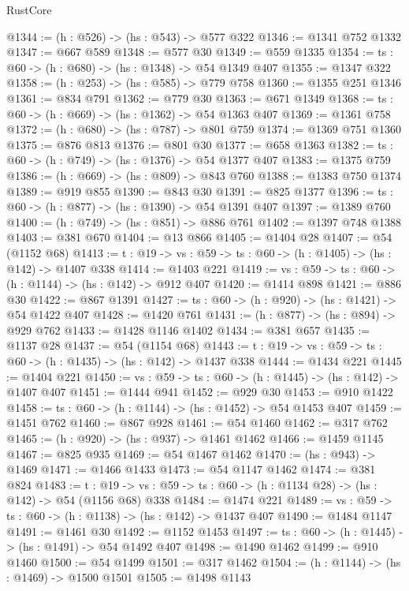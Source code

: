 \begin{lexlean}{RustCore}
\begin{coremodule}
@1344 := (h : @526) -> (hs : @543) -> @577 @322
@1346 := @1341 @752 @1332
@1347 := @667 @589
@1348 := @577 @30
@1349 := @559 @1335
@1354 := {ts : @60} -> (h : @680) -> (hs : @1348) -> @54 @1349 @407
@1355 := @1347 @322
@1358 := (h : @253) -> (hs : @585) -> @779 @758
@1360 := @1355 @251 @1346
@1361 := @834 @791
@1362 := @779 @30
@1363 := @671 @1349
@1368 := {ts : @60} -> (h : @669) -> (hs : @1362) -> @54 @1363 @407
@1369 := @1361 @758
@1372 := (h : @680) -> (hs : @787) -> @801 @759
@1374 := @1369 @751 @1360
@1375 := @876 @813
@1376 := @801 @30
@1377 := @658 @1363
@1382 := {ts : @60} -> (h : @749) -> (hs : @1376) -> @54 @1377 @407
@1383 := @1375 @759
@1386 := (h : @669) -> (hs : @809) -> @843 @760
@1388 := @1383 @750 @1374
@1389 := @919 @855
@1390 := @843 @30
@1391 := @825 @1377
@1396 := {ts : @60} -> (h : @877) -> (hs : @1390) -> @54 @1391 @407
@1397 := @1389 @760
@1400 := (h : @749) -> (hs : @851) -> @886 @761
@1402 := @1397 @748 @1388
@1403 := @381 @670
@1404 := @13 @866
@1405 := @1404 @28
@1407 := @54 (@1152 @68)
@1413 := {t : @19} -> {vs : @59} -> {ts : @60} -> (h : @1405) -> (hs : @142) -> @1407 @338
@1414 := @1403 @221
@1419 := {vs : @59} -> {ts : @60} -> (h : @1144) -> (hs : @142) -> @912 @407
@1420 := @1414 @898
@1421 := @886 @30
@1422 := @867 @1391
@1427 := {ts : @60} -> (h : @920) -> (hs : @1421) -> @54 @1422 @407
@1428 := @1420 @761
@1431 := (h : @877) -> (hs : @894) -> @929 @762
@1433 := @1428 @1146 @1402
@1434 := @381 @657
@1435 := @1137 @28
@1437 := @54 (@1154 @68)
@1443 := {t : @19} -> {vs : @59} -> {ts : @60} -> (h : @1435) -> (hs : @142) -> @1437 @338
@1444 := @1434 @221
@1445 := @1404 @221
@1450 := {vs : @59} -> {ts : @60} -> (h : @1445) -> (hs : @142) -> @1407 @407
@1451 := @1444 @941
@1452 := @929 @30
@1453 := @910 @1422
@1458 := {ts : @60} -> (h : @1144) -> (hs : @1452) -> @54 @1453 @407
@1459 := @1451 @762
@1460 := @867 @928
@1461 := @54 @1460
@1462 := @317 @762
@1465 := (h : @920) -> (hs : @937) -> @1461 @1462
@1466 := @1459 @1145
@1467 := @825 @935
@1469 := @54 @1467 @1462
@1470 := (hs : @943) -> @1469
@1471 := @1466 @1433
@1473 := @54 @1147 @1462
@1474 := @381 @824
@1483 := {t : @19} ->
  {vs : @59} -> {ts : @60} -> (h : @1134 @28) -> (hs : @142) -> @54 (@1156 @68) @338
@1484 := @1474 @221
@1489 := {vs : @59} -> {ts : @60} -> (h : @1138) -> (hs : @142) -> @1437 @407
@1490 := @1484 @1147
@1491 := @1461 @30
@1492 := @1152 @1453
@1497 := {ts : @60} -> (h : @1445) -> (hs : @1491) -> @54 @1492 @407
@1498 := @1490 @1462
@1499 := @910 @1460
@1500 := @54 @1499
@1501 := @317 @1462
@1504 := (h : @1144) -> (hs : @1469) -> @1500 @1501
@1505 := @1498 @1143

\end{coremodule}
\end{lexlean}
